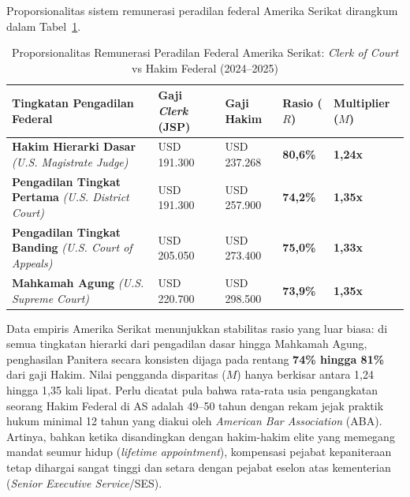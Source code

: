 \documentclass[12pt, a4paper]{article}
\begin{document}
Proporsionalitas sistem remunerasi peradilan federal Amerika Serikat dirangkum dalam Tabel~\ref{tab:komparasi-usa-lengkap}.

\begin{table}[H]
\centering
\fontsize{9}{11}\selectfont
\caption{Proporsionalitas Remunerasi Peradilan Federal Amerika Serikat: \textit{Clerk of Court} vs Hakim Federal (2024--2025)}
\label{tab:komparasi-usa-lengkap}
\renewcommand{\arraystretch}{1.35}
\begin{tabular}{p{5.0cm} p{2.7cm} p{2.7cm} p{1.7cm} p{1.7cm}}
\hline
\textbf{Tingkatan Pengadilan Federal} & \textbf{Gaji \textit{Clerk} (JSP)} & \textbf{Gaji Hakim} & \textbf{Rasio ($R$)} & \textbf{Multiplier ($M$)} \tabularnewline
\hline
\raggedright\textbf{Hakim Hierarki Dasar} \newline \textit{(U.S. Magistrate Judge)} & USD 191.300 & USD 237.268 & \textbf{80,6\%} & \textbf{1,24x} \tabularnewline
\raggedright\textbf{Pengadilan Tingkat Pertama} \newline \textit{(U.S. District Court)} & USD 191.300 & USD 257.900 & \textbf{74,2\%} & \textbf{1,35x} \tabularnewline
\raggedright\textbf{Pengadilan Tingkat Banding} \newline \textit{(U.S. Court of Appeals)} & USD 205.050 & USD 273.400 & \textbf{75,0\%} & \textbf{1,33x} \tabularnewline
\raggedright\textbf{Mahkamah Agung} \newline \textit{(U.S. Supreme Court)} & USD 220.700 & USD 298.500 & \textbf{73,9\%} & \textbf{1,35x} \tabularnewline
\hline
\end{tabular}
\end{table}

Data empiris Amerika Serikat menunjukkan stabilitas rasio yang luar biasa: di semua tingkatan hierarki dari pengadilan dasar hingga Mahkamah Agung, penghasilan Panitera secara konsisten dijaga pada rentang \textbf{74\% hingga 81\%} dari gaji Hakim. Nilai pengganda disparitas ($M$) hanya berkisar antara 1,24 hingga 1,35 kali lipat. Perlu dicatat pula bahwa rata-rata usia pengangkatan seorang Hakim Federal di AS adalah 49--50 tahun dengan rekam jejak praktik hukum minimal 12 tahun yang diakui oleh \textit{American Bar Association} (ABA). Artinya, bahkan ketika disandingkan dengan hakim-hakim elite yang memegang mandat seumur hidup (\textit{lifetime appointment}), kompensasi pejabat kepaniteraan tetap dihargai sangat tinggi dan setara dengan pejabat eselon atas kementerian (\textit{Senior Executive Service}/SES).
\end{document}
